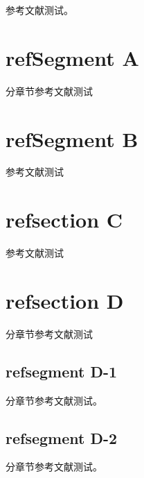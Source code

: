 \documentclass{article}
\begin{document}
\footnotesize

 	参考文献测试\cite{Gradshteyn2000--}。
    
    \section{refSegment A}
	\begin{refsegment}
		
		分章节参考文献测试\cite{Chiani2003-840-845}
		\printbibliography[segment=1,heading=subbibliography,title=文献A]
	\end{refsegment}
	
    \section{refSegment B}
	\begin{refsegment}
		参考文献测试\cite{张敏莉2007-500-503}
	\end{refsegment}
	\printbibliography[segment=2,heading=subbibliography,title=文献B]
	
    \section{refsection C}
	\begin{refsection}
		参考文献测试\cite{Zhang2007-500-503}
	\end{refsection}

\section{refsection D}
	\begin{refsection}
		分章节参考文献测试\cite{Andersen1995-42-49}
\subsection{refsegment D-1}
    	\begin{refsegment}
			分章节参考文献测试\cite{Simon2004--}。
		\end{refsegment}

\subsection{refsegment D-2}
		\begin{refsegment}
			分章节参考文献测试\cite{Lin2004--}。
		\end{refsegment}
	\end{refsection}
\end{document}
